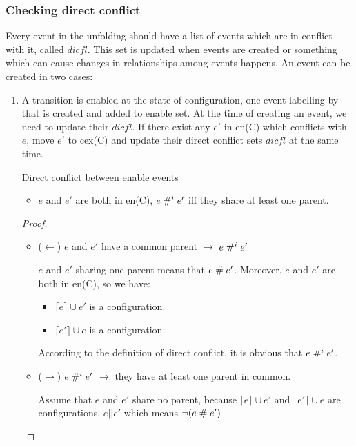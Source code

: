 \documentclass{llncs}
\begin{document}
\subsubsection{Checking direct conflict}
Every event in the unfolding should have a list of events which are in conflict with it, called $dicfl$. This set is updated when events are created or something which can cause changes in relationships among events happens.
An event can be created in two cases:
\begin{enumerate}
	\item
	A transition is enabled at the state of configuration, one event labelling by that is
	created and added to enable set. At the time of creating an event, we need to update their $dicfl$. If there exist any $e'$ in en(C) which conflicts with $e$,
	move $e'$ to cex(C) and update their direct conflict sets $dicfl$ at the same time. 		
	
	\begin{lemma}{Direct conflict between enable events}
		\begin{itemize}
			\item
			$e$ and $e'$ are both in en(C), $e \mathrel{\#^i_{}} e'$ iff they share at least one parent.		
		\end{itemize}
		\label{thm:lem1}
	\end{lemma}
	
	\begin{proof}
		\begin{itemize}
			\item
			($\leftarrow$) $e$ and $e'$ have a common parent $\rightarrow$ $e \mathrel{\#^i_{}} e'$
			
			$e$ and $e'$ sharing one parent means that  $e \mathrel{\#} e'$. Moreover, $e$ and $e'$ are both in
			en(C), so we have:
			\begin{itemize}
				\item
				$\lceil e \rceil \cup e'$ is a configuration.
				\item
				$\lceil e' \rceil \cup e$ is a configuration.
			\end{itemize} 
			According to the definition of direct conflict, it is obvious that $e \mathrel{\#^i_{}} e'$.
			
			\item
			($\rightarrow$) $e \mathrel{\#^i_{}} e'$ $\rightarrow$ they have at least one parent in common.
			
			Assume that $e$ and $e'$ share no parent, because $\lceil e \rceil \cup e'$ and $\lceil
			e' \rceil \cup e$ are configurations, $e || e'$ which means $\lnot (e \mathrel{\#} e')$
		\end{itemize}			
	\end{proof}			
	

\end{enumerate}
\end{document}
